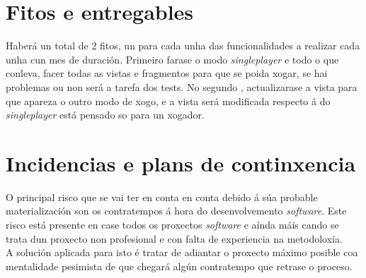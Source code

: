 \section{Fitos e entregables}
Haberá un total de 2
fitos, un para cada unha das funcionalidades a realizar cada unha cun mes de duración. Primeiro farase o modo \textit{singleplayer} e todo o que conleva, facer todas as vistas e fragmentos para que se poida xogar, se hai problemas ou non será a tarefa dos tests. No segundo , actualizarase a vista para que apareza o outro modo de xogo, e a vista será modificada respecto á do \textit{singleplayer} está pensado so para un xogador.%


\section{Incidencias e plans de continxencia}
O principal risco que se vai ter en conta en conta debido á súa probable materialización son os contratempos á hora do desenvolvemento \textit{software}. Este risco está presente en case todos os proxectos \textit{software} e aínda máis cando se trata dun proxecto non profesional e con falta de experiencia na metodoloxía.\\
A solución aplicada para isto é tratar de adiantar o proxecto máximo posible coa mentalidade pesimista de que chegará algún contratempo que retrase o proceso.

 \let\cleardoublepage=\clearpage 